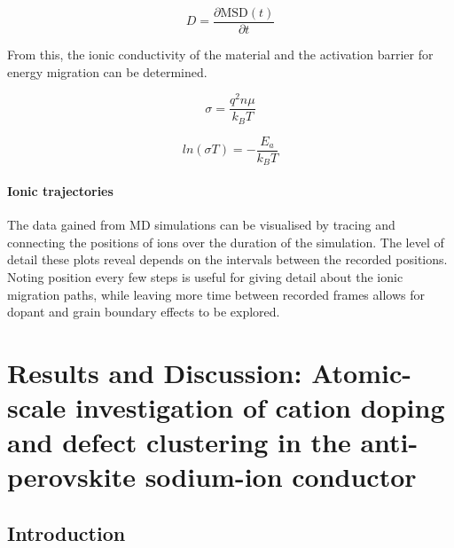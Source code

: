 \documentclass[12pt]{report}
\begin{document}
\begin{equation}
    D = \frac{\partial\mathrm{MSD}(t)}{\partial t}
\end{equation}

\noindent
From this, the ionic conductivity of the material and the activation barrier for energy migration can be determined.

\begin{equation}
    \sigma = \frac{q^2n\mu}{k_B T}
\end{equation}

\begin{equation}
    ln(\sigma T) = -\frac{E_a}{k_BT} 
\end{equation}

\subsubsection{Ionic trajectories}

The data gained from MD simulations can be visualised by tracing and connecting the positions of ions over the duration of the simulation.
The level of detail these plots reveal depends on the intervals between the recorded positions.
Noting position every few steps is useful for giving detail about the ionic migration paths, while leaving more time between recorded frames allows for dopant and grain boundary effects to be explored.

\clearpage










\chapter[Results and Discussion]{Results and Discussion:
\textnormal{Atomic-scale investigation of cation doping and defect clustering in the anti-perovskite  sodium-ion conductor}}

\section{Introduction}
\end{document}
